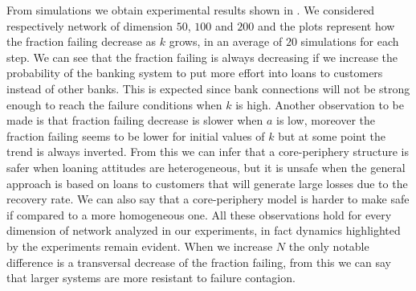 \documentclass[a4paper, 11pt]{article}
\begin{document}
From simulations we obtain experimental results shown in . We considered respectively network of dimension $50$, $100$ and $200$ and the plots represent how the fraction failing decrease as $k$ grows, in an average of $20$ simulations for each step. We can see that the fraction failing is always decreasing if we increase the probability of the banking system to put more effort into loans to customers instead of other banks. This is expected since bank connections will not be strong enough to reach the failure conditions when $k$ is high. Another observation to be made is that fraction failing decrease is slower when $a$ is low, moreover the fraction failing seems to be lower for initial values of $k$ but at some point the trend is always inverted. From this we can infer that a core-periphery structure is safer when loaning attitudes are heterogeneous, but it is unsafe when the general approach is based on loans to customers that will generate large losses due to the recovery rate. We can also say that a core-periphery model is harder to make safe if compared to a more homogeneous one. All these observations hold for every dimension of network analyzed in our experiments, in fact dynamics highlighted by the experiments remain evident. When we increase $N$ the only notable difference is a transversal decrease of the fraction failing, from this we can say that larger systems are more resistant to failure contagion.
\end{document}
